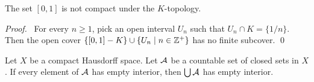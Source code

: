 \begin{example}
    \label{example:zero_one_not_compact}
    The set $[0,1]$ is not compact under the $K$-topology.
\end{example}

\begin{proof}
    \pf\ For every $n \geq 1$, pick an open interval $U_n$ such that $U_n \cap K = \{ 1/n \}$.
    Then the open cover $\{ [0,1]-K \} \cup \{ U_n \mid n \in \ZZ^+ \}$ has no finite subcover. \qed
\end{proof}

\begin{proposition}[AC]
    Let $X$ be a compact Hausdorff space. Let $\AA$ be a countable set of closed sets in $X$.
    If every element of $\AA$ has empty interior, then $\bigcup \AA$ has empty interior.
\end{proposition}

